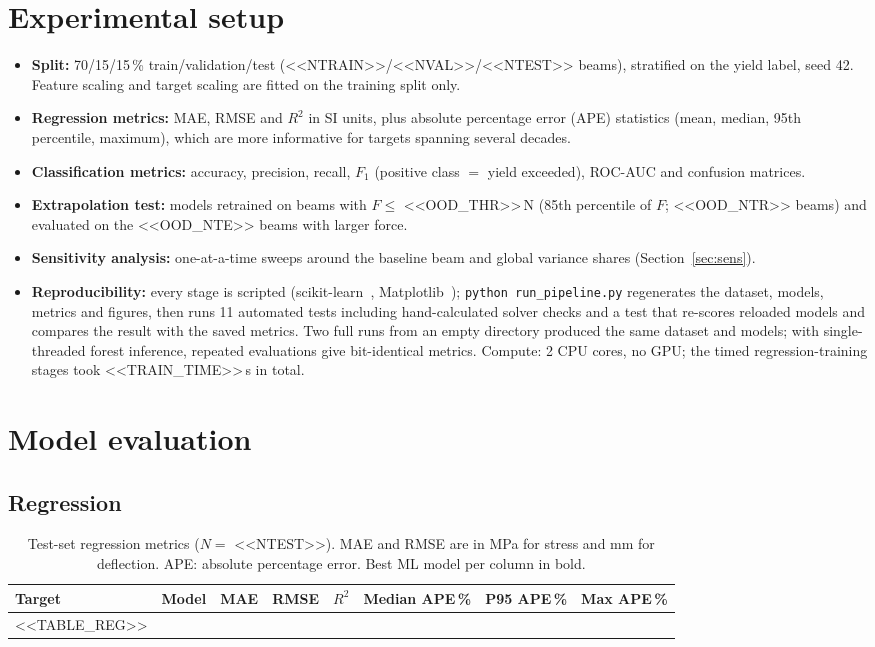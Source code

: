 \documentclass[11pt,a4paper]{article}
\begin{document}
\section{Experimental setup}
\begin{itemize}
\item \textbf{Split:} 70/15/15\,\% train/validation/test (<<NTRAIN>>/<<NVAL>>/<<NTEST>> beams), stratified on the yield
label, seed 42. Feature scaling and target scaling are fitted on the training split only.
\item \textbf{Regression metrics:} MAE, RMSE and $R^2$ in SI units, plus absolute percentage error (APE) statistics
(mean, median, 95th percentile, maximum), which are more informative for targets spanning several decades.
\item \textbf{Classification metrics:} accuracy, precision, recall, $F_1$ (positive class $=$ yield exceeded), ROC-AUC
and confusion matrices.
\item \textbf{Extrapolation test:} models retrained on beams with $F\le$ <<OOD_THR>>\,N (85th percentile of $F$;
<<OOD_NTR>> beams) and evaluated on the <<OOD_NTE>> beams with larger force.
\item \textbf{Sensitivity analysis:} one-at-a-time sweeps around the baseline beam and global variance shares (Section~\ref{sec:sens}).
\item \textbf{Reproducibility:} every stage is scripted (scikit-learn~\cite{pedregosa2011}, Matplotlib~\cite{hunter2007}); \texttt{python run\_pipeline.py} regenerates the dataset,
models, metrics and figures, then runs 11 automated tests including hand-calculated solver checks and a test that
re-scores reloaded models and compares the result with the saved metrics. Two full runs from an empty directory
produced the same dataset and models; with single-threaded forest inference, repeated evaluations give bit-identical metrics. Compute: 2 CPU cores, no GPU; the timed regression-training stages took <<TRAIN_TIME>>\,s in total.
\end{itemize}

\section{Model evaluation}
\subsection{Regression}
\begin{table}[H]\centering\footnotesize\setlength{\tabcolsep}{4pt}
\caption{Test-set regression metrics ($N=$ <<NTEST>>). MAE and RMSE are in MPa for stress and mm for deflection.
APE: absolute percentage error. Best ML model per column in bold.}
\label{tab:reg}
\begin{tabular}{llrrrrrr}
\toprule
Target & Model & MAE & RMSE & $R^2$ & Median APE\,\% & P95 APE\,\% & Max APE\,\%\\
\midrule
<<TABLE_REG>>
\bottomrule
\end{tabular}
\end{table}
\end{document}
